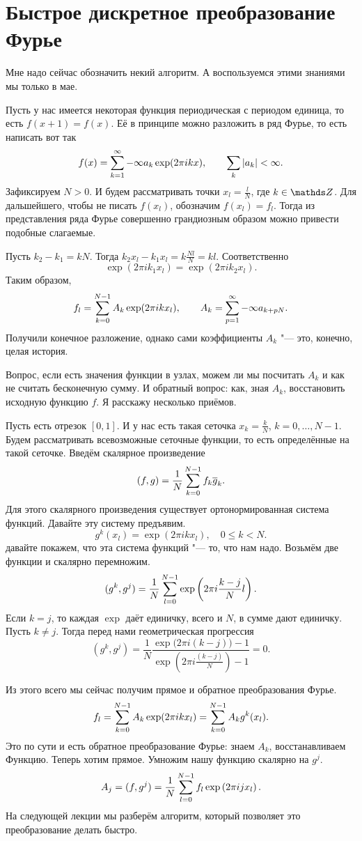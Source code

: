 \section{Быстрое дискретное преобразование Фурье}
Мне надо сейчас обозначить некий алгоритм. А воспользуемся этими знаниями мы только в мае.

Пусть у нас имеется некоторая функция периодическая с периодом единица, то есть $f(x+1)=f(x)$. Её в принципе можно разложить в ряд Фурье, то есть написать вот так
\[
  f(x) = \sum\limits_{{k}={1}}^\infty{-\infty} a_k \exp(2\pi ik x),\qquad \sum\limits_k|a_k|<\infty.
\]
Зафиксируем $N>0$. И будем рассматривать точки $x_l = \frac lN$, где $k\in \Z$. Для дальшейшего, чтобы не писать $f(x_l)$, обозначим $f(x_l) = f_l$. Тогда из представления ряда Фурье совершенно грандиозным образом можно привести подобные слагаемые.

Пусть $k_2 - k_1 = kN$. Тогда $k_2x_l - k_1 x_l = k\frac{ Nl}N = kl$. Соответственно
\[
  \exp(2\pi i k_1 x_l) = \exp (2\pi i k_2x_l).
\]
Таким образом,
\[
  f_l = \sum\limits_{k = 0}^{N-1} A_k\exp(2\pi i k x_l),\qquad A_k = \sum\limits_{{p}={1}}^\infty{-\infty} a_{k+pN}.
\]
Получили конечное разложение, однако сами коэффициенты $A_k$ "--- это, конечно, целая история.

Вопрос, если есть значения функции в узлах, можем ли мы посчитать $A_k$ и как не считать бесконечную сумму. И обратный вопрос: как, зная $A_k$, восстановить исходную функцию $f$.
Я расскажу несколько приёмов.

Пусть есть отрезок $[0,1]$. И у нас есть такая сеточка $x_k = \frac kN$, $k=0,\dots, N-1$. Будем рассматривать всевозможные сеточные функции, то есть определённые на такой сеточке. Введём скалярное произведение
\[
  (f,g) = \frac1 N \sum\limits_{k = 0}^{N-1} f_k \overline{g}_k.
\]
Для этого скалярного произведения существует ортонормированная система функций. Давайте эту систему предъявим.
\[
  g^k(x_l) = \exp(2\pi i k x_l), \quad 0\le k< N.
\]
давайте покажем, что эта система функций "--- то, что нам надо. Возьмём две функции и скалярно перемножим.
\[
  (g^k,g^j) = \frac1N \sum\limits_{l = 0}^{N-1}\exp\left(2\pi i\frac{k-j}Nl\right).
\]
Если $k=j$, то каждая $\exp$ даёт единичку, всего и $N$, в сумме дают единичку.
Пусть $k\ne j$. Тогда перед нами геометрическая прогрессия
\[
  (g^k,g^j) = \frac1N \frac{\exp\big(2\pi i(k-j)\big) -1}{\exp\left(2\pi i\frac{(k-j)}N\right) - 1} = 0.
\]

Из этого всего мы сейчас получим прямое и обратное преобразования Фурье.
\[
  f_l = \sum\limits_{k = 0}^{N-1} A_k \exp(2\pi i k x_l) = \sum\limits_{k = 0}^{N-1} A_k g^k(x_l).
\]
Это по сути и есть обратное преобразование Фурье: знаем $A_k$, восстанавливаем Функцию. Теперь хотим прямое. Умножим нашу функцию скалярно на $g^j$.
\[
  A_j = (f,g^j) = \frac1N\sum\limits_{l = 0}^{N-1} f_l\exp\left(2\pi i j x_l\right).
\]
На следующей лекции мы разберём алгоритм, который позволяет это преобразование делать быстро.